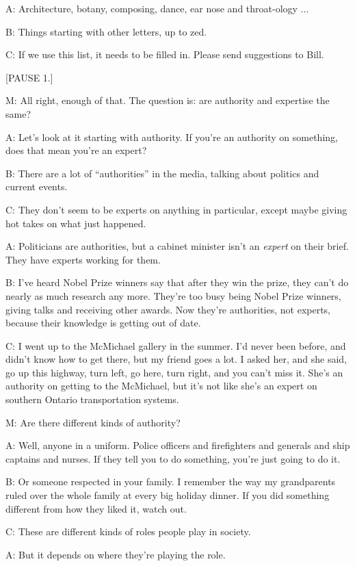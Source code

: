 \documentclass[17pt]{extarticle}
\begin{document}
A:  Architecture, botany, composing, dance, ear nose and throat-ology ...

B:  Things starting with other letters, up to zed.

C:  If we use this list, it needs to be filled in.  Please send suggestions to Bill.

[PAUSE 1.]

M:  All right, enough of that.  The question is:  are authority and expertise the same?

A:  Let's look at it starting with authority.  If you're an authority on something, does that mean you're an expert?

B:  There are a lot of ``authorities'' in the media, talking about politics and current events.

C:  They don't seem to be experts on anything in particular, except maybe giving hot takes on what just happened.

A:  Politicians are authorities, but a cabinet minister isn't an \textit{expert} on their brief.  They have experts working for them.

B:  I've heard Nobel Prize winners say that after they win the prize, they can't do nearly as much research any more.  They're too busy being Nobel Prize winners, giving talks and receiving other awards.  Now they're authorities, not experts, because their knowledge is getting out of date.

C:  I went up to the McMichael gallery in the summer.  I'd never been before, and didn't know how to get there, but my friend goes a lot.  I asked her, and she said, go up this highway, turn left, go here, turn right, and you can't miss it.  She's an authority on getting to the McMichael, but it's not like she's an expert on southern Ontario transportation systems.

M:  Are there different kinds of authority?

A:  Well, anyone in a uniform.  Police officers and firefighters and generals and ship captains and nurses.  If they tell you to do something, you're just going to do it.

B:  Or someone respected in your family.  I remember the way my grandparents ruled over the whole family at every big holiday dinner.  If you did something different from how they liked it, watch out.

C:  These are different kinds of roles people play in society.

A:  But it depends on where they're playing the role.
\end{document}
